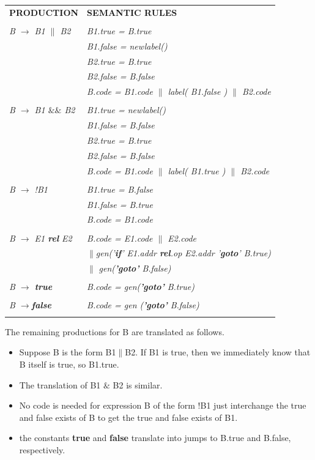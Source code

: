 \documentclass[12pt, oneside, a4paper]{article}
\begin{document}
\begin{tabular}{ll}
\textbf{PRODUCTION}& \textbf{SEMANTIC RULES}\\\\
\emph{B $\rightarrow$ B1 $\|$ B2}& \emph{B1.true = B.true}\\
&\emph{B1.false = newlabel()}\\
&\emph{B2.true = B.true}\\
& \emph{B2.false = B.false}\\
&\emph{B.code = B1.code $\|$ label( B1.false ) $\|$ B2.code }\\\\
\emph{B $\rightarrow$ B1 $\&\&$ B2}& \emph{B1.true = newlabel()}\\
&\emph{B1.false = B.false}\\
&\emph{B2.true = B.true }\\
&\emph{B2.false = B.false}\\
&\emph{B.code = B1.code $\|$ label( B1.true ) $\|$ B2.code}\\\\
\emph{B $\rightarrow$ !B1}& \emph{B1.true = B.false}\\
&\emph{B1.false = B.true}\\
&\emph{B.code = B1.code}\\\\
\emph{B $\rightarrow$ E1 \textbf{rel} E2}&\emph{B.code = E1.code $\|$ E2.code}\\
& $\|$\emph{gen('\textbf{if}' E1.addr \textbf{rel}.op E2.addr '\textbf{goto}' B.true)}\\
& $\|$ \emph{gen(\textbf{'goto'} B.false)}\\\\
\emph{B $\rightarrow$ \textbf{true}}& \emph{B.code = gen(\textbf{'goto'} B.true)}\\\\
\emph{B $\rightarrow$\textbf{false}}& \emph{B.code = gen (\textbf{'goto'} B.false)}\\\\

\end{tabular}

The remaining productions for B are translated as follows.
\begin{itemize}
\item Suppose B is the form B1$\|$B2. If B1 is true, then we immediately know that B itself is true, so B1.true.\\
\item The translation of B1 $\&$ B2 is similar.\\
\item No code is needed for expression B of the form !B1 just interchange the true and false exists of B to get the true and false exists of B1.\\
\item the constants \textbf{true} and \textbf{false} translate into jumps to B.true and B.false, respectively.\\
\end{itemize}
 
\end{document}
